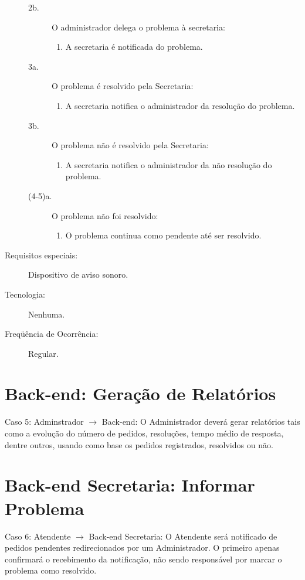\documentclass[brazil]{abnt}
\begin{document}
\begin{description}
\begin{description}
	\item[2b.] O administrador delega o problema à secretaria:
	\begin{enumerate}
  		\item A secretaria é notificada do problema.
	\end{enumerate}

	\item[3a.] O problema é resolvido pela Secretaria:
	\begin{enumerate}
  		\item A secretaria notifica o administrador da resolução do problema.
	\end{enumerate}

	\item[3b.] O problema não é resolvido pela Secretaria:
	\begin{enumerate}
  		\item A secretaria notifica o administrador da não resolução do problema.
	\end{enumerate}

	\item[(4-5)a.] O problema não foi resolvido:
	\begin{enumerate}
  		\item O problema continua como pendente até ser resolvido.
	\end{enumerate}
\end{description}

\item[Requisitos especiais:] Dispositivo de aviso sonoro.
\item[Tecnologia:] Nenhuma.
\item[Freqüência de Ocorrência:] Regular.

\end{description}
\section{Back-end: Geração de Relatórios}
     Caso 5: Adminstrador $\rightarrow$ Back-end: O Administrador deverá gerar
     relatórios tais como a evolução do número de pedidos, resoluções, tempo médio de resposta, dentre outros, usando como base os pedidos registrados, resolvidos ou não.

\section{Back-end Secretaria: Informar Problema}
     Caso 6: Atendente $\rightarrow$ Back-end Secretaria: O Atendente será
     notificado de pedidos pendentes redirecionados por um Administrador. O primeiro apenas confirmará o recebimento da notificação, não sendo responsável por marcar o problema como resolvido.
\end{document}
